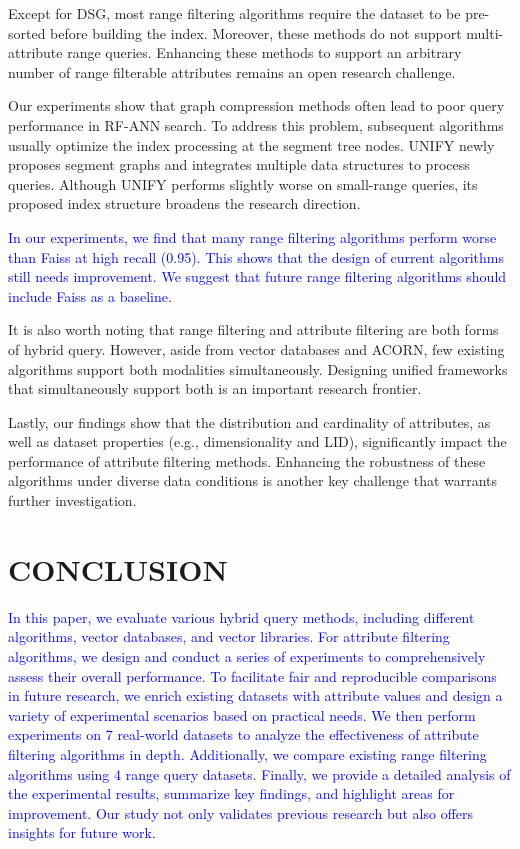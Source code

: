 \documentclass[sigconf, nonacm]{acmart}
\begin{document}
Except for DSG, most range filtering algorithms require the dataset to be pre-sorted before building the index. Moreover, these methods do not support multi-attribute range queries. Enhancing these methods to support an arbitrary number of range filterable attributes remains an open research challenge.

Our experiments show that graph compression methods often lead to poor query performance in RF-ANN search. To address this problem, subsequent algorithms usually optimize the index processing at the segment tree nodes. UNIFY newly proposes segment graphs and integrates multiple data structures to process queries. Although UNIFY performs slightly worse on small-range queries, its proposed index structure broadens the research direction.

\textcolor{blue}{
In our experiments, we find that many range filtering algorithms perform worse than Faiss at high recall (0.95). This shows that the design of current algorithms still needs improvement. We suggest that future range filtering algorithms should include Faiss as a baseline.
}

It is also worth noting that range filtering and attribute filtering are both forms of hybrid query. However, aside from vector databases and ACORN, few existing algorithms support both modalities simultaneously. Designing unified frameworks that simultaneously support both is an important research frontier. 

Lastly, our findings show that the distribution and cardinality of attributes, as well as dataset properties (e.g., dimensionality and LID), significantly impact the performance of attribute filtering methods. Enhancing the robustness of these algorithms under diverse data conditions is another key challenge that warrants further investigation.


\section{CONCLUSION}
\textcolor{blue}{
	In this paper, we evaluate various hybrid query methods, including different algorithms, vector databases, and vector libraries. For attribute filtering algorithms, we design and conduct a series of experiments to comprehensively assess their overall performance. To facilitate fair and reproducible comparisons in future research, we enrich existing datasets with attribute values and design a variety of experimental scenarios based on practical needs. We then perform experiments on 7 real-world datasets to analyze the effectiveness of attribute filtering algorithms in depth. Additionally, we compare existing range filtering algorithms using 4 range query datasets. Finally, we provide a detailed analysis of the experimental results, summarize key findings, and highlight areas for improvement. Our study not only validates previous research but also offers insights for future work.
}




\clearpage



\end{document}
